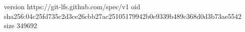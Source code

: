 version https://git-lfs.github.com/spec/v1
oid sha256:04c25fd735c2d3ce26cbb27ac25105179942b0e9339b489c368d0d3b73ae5542
size 349692
